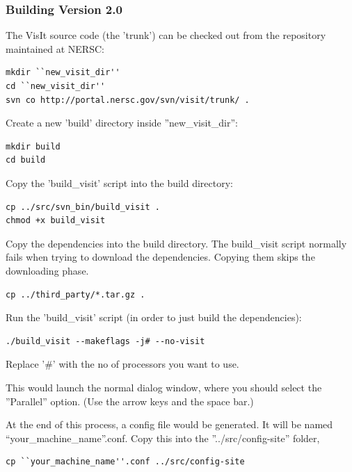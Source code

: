 \documentclass[12pt]{article}
\begin{document}
\subsubsection{Building Version 2.0}
\label{subsec:VisItVersion2_Build}

The VisIt source code (the 'trunk') can be checked out from the
repository maintained at NERSC:

\begin{verbatim}
mkdir ``new_visit_dir''
cd ``new_visit_dir'' 
svn co http://portal.nersc.gov/svn/visit/trunk/ .
\end{verbatim}

Create a new 'build' directory inside ''new_visit_dir'':

\begin{verbatim}
mkdir build
cd build
\end{verbatim}

Copy the 'build_visit' script into the build directory:

\begin{verbatim}
cp ../src/svn_bin/build_visit .
chmod +x build_visit
\end{verbatim}

Copy the dependencies into the build directory. The build_visit script
normally fails when trying to download the dependencies.  Copying them
skips the downloading phase.

\begin{verbatim}
cp ../third_party/*.tar.gz .
\end{verbatim}

Run the 'build_visit' script (in order to just build the dependencies):

\begin{verbatim}
./build_visit --makeflags -j# --no-visit
\end{verbatim}

Replace '#' with the no of processors you want to use.

This would launch the normal dialog window, where you should select
the ''Parallel'' option.  (Use the arrow keys and the space bar.)

At the end of this process, a config file would be generated. It will
be named ``your_machine_name''.conf. Copy this into the
''../src/config-site'' folder,

\begin{verbatim}
cp ``your_machine_name''.conf ../src/config-site
\end{verbatim}
\end{document}
